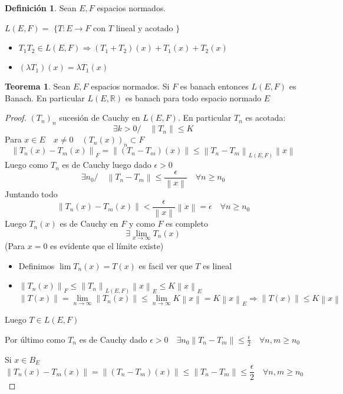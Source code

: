 \documentclass[12pt]{article}
\newcommand{\R}{\mathbb{R}}
\newcommand{\Ra}{\Rightarrow}
\newcommand{\ra}{\rightarrow}
\newcommand{\norm}[1]{\left\lVert#1\right\rVert}
\theoremstyle{definition}
\newtheorem{definition}{Definición}[section]
\newtheorem{theorem}{Teorema}
\begin{document}
      \begin{definition}
	Sean $E, F$ espacios normados.
	\begin{center}
	  $L(E,F) =$ $\{ T:E \ra F$ con $T$ lineal y acotado $\}$
	\end{center}
	\begin{itemize}

	  \item $T_{1} T_{2} \in L(E,F) \Ra (T_{1}+T_{2})(x) + T_{1}(x) + T_{2}(x)$
	  \item $(\lambda T_{1}) (x) = \lambda T_{1}(x)$  

	\end{itemize}
      \end{definition}
      \begin{theorem}
	Sean $E,F$ espacios normados. Si $F$ es banach entonces $L(E,F)$ es Banach. En particular $L(E, \R)$ es banach para todo espacio normado $E$
      
	\begin{proof}
	  $(T_{n})_{n}$ sucesión de Cauchy en $L(E,F)$. En particular $T_{n}$ es acotada: 
	  $$\exists k > 0 / \quad \norm{T_{n}} \leq K$$
	Para $x \in E \quad x \neq 0 \quad (T_{n}(x))_{n} \subset F$
	$$\norm{T_{n}(x) - T_{m}(x)}_{F} = \norm{(T_{n} - T_{m})(x)} \leq \norm{T_{n} - T_{m}}_{L(E,F)} \norm{x}$$	
	Luego como $T_{n}$ es de Cauchy luego dado $\epsilon > 0$
	$$ \exists  n_{0} / \quad \norm{T_{n} - T_{m}} \leq \frac{\epsilon}{\norm{x}} \quad \forall n \geq n_{0} $$
Juntando todo
$$ \norm{T_{n}(x) - T_{m}(x)} < \frac{\epsilon}{\norm{x}} \norm{x} = \epsilon \quad \forall n \geq n_{0}$$ 
Luego $T_{n}(x)$ es de Cauchy en $F$ y como $F$ es completo $$ \exists \lim_{x \ra \infty}{T_{n}(x)}$$
(Para $x = 0 $ es evidente que el límite existe)

\begin{itemize}
  \item Definimos $\lim{T_{n}(x)} = T(x)$ es facil ver que $T$ es lineal
  \item $\norm{T_{n}(x)}_{F} \leq \norm{T_{n}}_{L(E,F)} \norm{x}_{E} \leq K \norm{x}_{E}$
    $$ \norm{T(x)} =\lim_{n \ra \infty}{\norm{T_{n} (x)}} \leq \lim_{n \ra \infty}{K \norm{x}} = K \norm{x}_{E} \Ra \norm{T(x)} \leq K \norm{x}$$
  \end{itemize}
    Luego $T \in L(E,F)$

    Por último como $T_{n}$ es de Cauchy dado $\epsilon > 0 \quad \exists n_{0} \norm{T_{n} - T_{m}} \leq \frac{\epsilon}{2} \quad \forall n,m \geq n_{0}$
    
    Si $x \in B_{E}$ $$ \norm{T_{n}(x) - T_{m}(x)} = \norm{(T_{n} -T_{m})(x)} \leq \norm{T_{n} - T_{m}} \leq \frac{\epsilon}{2} \quad \forall n,m \geq n_{0}$$ 
   

\end{proof}
\end{theorem}
\end{document}
